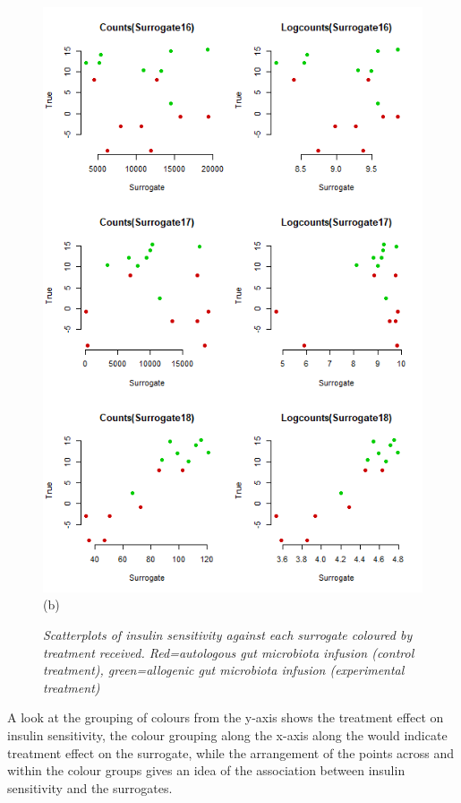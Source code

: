 \documentclass[a4paper,12pt]{article}
\begin{document}
\begin{figure}[H]
\begin{minipage}{0.5\textwidth}
			\includegraphics[scale=0.5]{exploration-6.png}\\(b)
		\end{minipage}
		\caption{\small \textit{Scatterplots of insulin sensitivity against each surrogate coloured by treatment received. Red=autologous gut microbiota infusion (control treatment), green=allogenic gut microbiota infusion (experimental treatment)}}
	\end{figure}
	A look at the grouping of colours from the y-axis shows the treatment effect on insulin sensitivity, the colour grouping along the x-axis along the would indicate treatment effect on the surrogate, while the arrangement of the points across and within the colour groups gives an idea of the association between insulin sensitivity and the surrogates.\\
	
\end{document}
